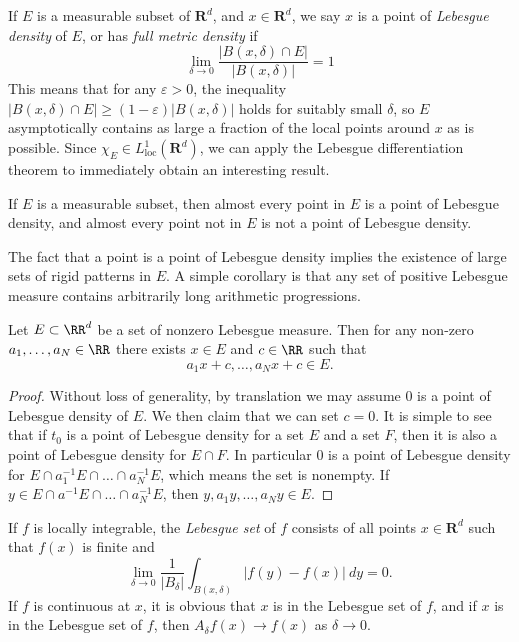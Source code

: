 If $E$ is a measurable subset of $\mathbf{R}^d$, and $x \in \mathbf{R}^d$, we say $x$ is a point of \emph{Lebesgue density} of $E$, or has \emph{full metric density} if
%
\[ \lim_{\delta \to 0} \frac{|B(x,\delta) \cap E|}{|B(x,\delta)|} = 1 \]
%
This means that for any $\varepsilon > 0$, the inequality $|B(x,\delta) \cap E| \geq (1 - \varepsilon) |B(x,\delta)|$ holds for suitably small $\delta$, so $E$ asymptotically contains as large a fraction of the local points around $x$ as is possible. Since $\chi_E \in L^1_{\text{loc}}(\mathbf{R}^d)$, we can apply the Lebesgue differentiation theorem to immediately obtain an interesting result.

\begin{theorem}
    If $E$ is a measurable subset, then almost every point in $E$ is a point of Lebesgue density, and almost every point not in $E$ is not a point of Lebesgue density.
\end{theorem}

The fact that a point is a point of Lebesgue density implies the existence of large sets of rigid patterns in $E$. A simple corollary is that any set of positive Lebesgue measure contains arbitrarily long arithmetic progressions.

\begin{theorem}
  Let $E \subset \RR^d$ be a set of nonzero Lebesgue measure. Then for any non-zero $a_1,\dots,a_N \in \RR$ there exists $x \in E$ and $c \in \RR$ such that
  \[ a_1 x + c,\dots, a_N x + c \in E. \]
\end{theorem}
\begin{proof}
  Without loss of generality, by translation we may assume $0$ is a point of Lebesgue density of $E$. We then claim that we can set $c = 0$. It is simple to see that if $t_0$ is a point of Lebesgue density for a set $E$ and a set $F$, then it is also a point of Lebesgue density for $E \cap F$. In particular $0$ is a point of Lebesgue density for $E \cap a_1^{-1} E \cap \dots \cap a_N^{-1} E$, which means the set is nonempty. If $y \in E \cap a^{-1} E \cap \dots \cap a_N^{-1} E$, then $y,a_1y, \dots, a_N y \in E$.
\end{proof}

If $f$ is locally integrable, the \emph{Lebesgue set} of $f$ consists of all points $x \in \mathbf{R}^d$ such that $f(x)$ is finite and
%
\[ \lim_{\delta \to 0} \frac{1}{|B_\delta|} \int_{B(x,\delta)} |f(y) - f(x)|\ dy = 0. \]
%
If $f$ is continuous at $x$, it is obvious that $x$ is in the Lebesgue set of $f$, and if $x$ is in the Lebesgue set of $f$, then $A_\delta f(x) \to f(x)$ as $\delta \to 0$.

